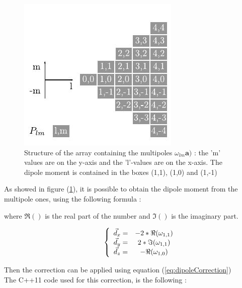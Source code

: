 \documentclass[11pt,twoside,a4paper]{report}
\begin{document}
	\begin{figure}[H]
	\label{fig:triArray} 
	\includegraphics[scale=1]{triArray}
    \centering 
    \caption{Structure of the array containing the multipoles $\omega_{lm}\textbf{a})$ : the 'm' values are on the y-axis and the 'l'-values are on the x-axis. The dipole moment is contained in the boxes (1,1), (1,0) and (1,-1) }
   \label{fig:triArray}     
   \end{figure} 

As showed in figure (\ref{fig:triArray}), it is possible to obtain the dipole moment from the multipole ones, using the following formula :



where $\Re()$ is the real part of the number and $\Im()$ is the imaginary part.

\begin{equation}
\hspace{10 mm}
\left\lbrace
\begin{array}{ccc}
\vec{d}_x = & -2 * \Re(\omega_{1,1})\\
\vec{d}_y = &  2 * \Im(\omega_{1,1})\\
\vec{d}_z = & -\Re(\omega_{1,0})
\end{array}\right.
\end{equation}

Then the correction can be applied using equation (\ref{eq:dipoleCorrection})\\


The C++11 code used for this correction, is the following :
	
\end{document}
